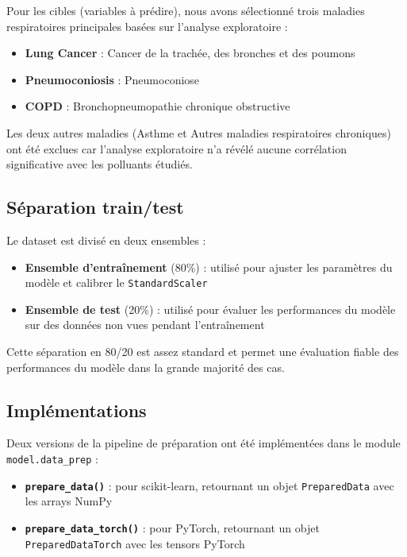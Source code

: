 \documentclass[11pt,a4paper]{article}
\begin{document}
Pour les cibles (variables à prédire), nous avons sélectionné trois maladies respiratoires principales basées sur l'analyse exploratoire :
\begin{itemize}[noitemsep]
    \item \textbf{Lung Cancer} : Cancer de la trachée, des bronches et des poumons
    \item \textbf{Pneumoconiosis} : Pneumoconiose
    \item \textbf{COPD} : Bronchopneumopathie chronique obstructive
\end{itemize}

Les deux autres maladies (Asthme et Autres maladies respiratoires chroniques) ont été exclues car l'analyse exploratoire n'a révélé aucune corrélation significative avec les polluants étudiés.

\subsection{Séparation train/test}

Le dataset est divisé en deux ensembles :
\begin{itemize}[noitemsep]
    \item \textbf{Ensemble d'entraînement} (80\%) : utilisé pour ajuster les paramètres du modèle et calibrer le \lstinline{StandardScaler}
    \item \textbf{Ensemble de test} (20\%) : utilisé pour évaluer les performances du modèle sur des données non vues pendant l'entraînement
\end{itemize}

Cette séparation en 80/20 est assez standard et permet une évaluation fiable des performances du modèle dans la grande majorité des cas.

\subsection{Implémentations}

Deux versions de la pipeline de préparation ont été implémentées dans le module \lstinline{model.data_prep} :

\begin{itemize}[noitemsep]
    \item \textbf{\lstinline{prepare_data()}} : pour scikit-learn, retournant un objet \lstinline{PreparedData} avec les arrays NumPy
    \item \textbf{\lstinline{prepare_data_torch()}} : pour PyTorch, retournant un objet \lstinline{PreparedDataTorch} avec les tensors PyTorch
\end{itemize}
\end{document}
